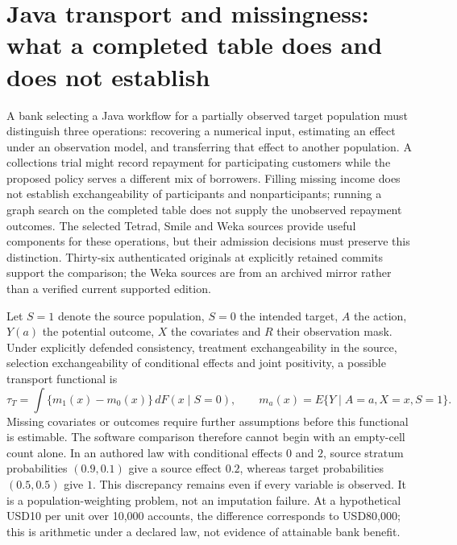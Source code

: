 \section[Java transport and missingness contracts]{Java transport and missingness: what a completed table does and does not establish}
\label{sec:exec25-jtm}

A bank selecting a Java workflow for a partially observed target population must distinguish three operations: recovering a numerical input, estimating an effect under an observation model, and transferring that effect to another population. A collections trial might record repayment for participating customers while the proposed policy serves a different mix of borrowers. Filling missing income does not establish exchangeability of participants and nonparticipants; running a graph search on the completed table does not supply the unobserved repayment outcomes. The selected Tetrad, Smile and Weka sources provide useful components for these operations, but their admission decisions must preserve this distinction. Thirty-six authenticated originals at explicitly retained commits support the comparison; the Weka sources are from an archived mirror rather than a verified current supported edition.~\citep{exec25_jtm_tetrad,exec25_jtm_smile,exec25_jtm_weka}

Let $S=1$ denote the source population, $S=0$ the intended target, $A$ the action, $Y(a)$ the potential outcome, $X$ the covariates and $R$ their observation mask. Under explicitly defended consistency, treatment exchangeability in the source, selection exchangeability of conditional effects and joint positivity, a possible transport functional is
\[
 \tau_T=\int\{m_1(x)-m_0(x)\}\,dF(x\mid S=0),
 \qquad m_a(x)=E\{Y\mid A=a,X=x,S=1\}.
\]
Missing covariates or outcomes require further assumptions before this functional is estimable. The software comparison therefore cannot begin with an empty-cell count alone. In an authored law with conditional effects $0$ and $2$, source stratum probabilities $(0.9,0.1)$ give a source effect $0.2$, whereas target probabilities $(0.5,0.5)$ give $1$. This discrepancy remains even if every variable is observed. It is a population-weighting problem, not an imputation failure. At a hypothetical USD10 per unit over 10,000 accounts, the difference corresponds to USD80,000; this is arithmetic under a declared law, not evidence of attainable bank benefit.~\citep{exec25_jtm_choice}

